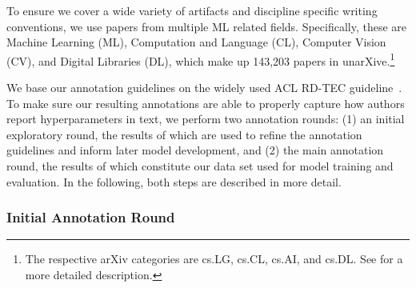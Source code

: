 To ensure we cover a wide variety of artifacts and discipline specific writing conventions, we use papers from multiple ML related fields. Specifically, these are Machine Learning (ML), Computation and Language (CL), Computer Vision (CV), and Digital Libraries (DL), which make up 143,203 papers in unarXive.\footnote{The respective arXiv categories are cs.LG, cs.CL, cs.AI, and cs.DL. See  for a more detailed description.}

We base our annotation guidelines on the widely used ACL RD-TEC guideline~\cite{Qasemizadeh2016}. To make sure our resulting annotations are able to properly capture how authors report hyperparameters in text, we perform two annotation rounds: (1) an initial exploratory round, the results of which are used to refine the annotation guidelines and inform later model development, and (2) the main annotation round, the results of which constitute our data set used for model training and evaluation. In the following, both steps are described in more detail.

\subsubsection{Initial Annotation Round}\label{sec:exploreannot}


